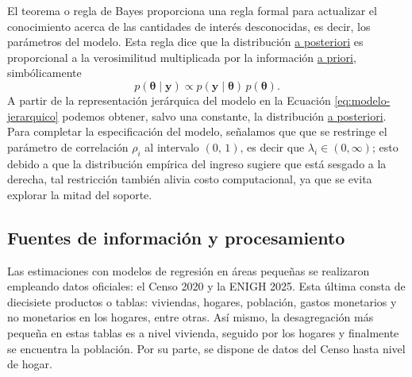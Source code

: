 \documentclass[11pt]{article}
\begin{document}
El teorema o {regla de Bayes} proporciona una regla formal para actualizar el conocimiento acerca de las cantidades de interés desconocidas, es decir, los parámetros del modelo. Esta regla dice que la distribución \underline{a posteriori} es proporcional a la verosimilitud multiplicada por la información \underline{a priori}, simbólicamente
\begin{equation}
p(\boldsymbol{\theta} \mid \boldsymbol{y}) \propto p(\boldsymbol{y}\mid \boldsymbol{\theta}) \, p(\boldsymbol{\theta}).
\end{equation}
A partir de la representación jerárquica del modelo en la Ecuación \ref{eq:modelo-jerarquico} podemos obtener, salvo una constante, la distribución \underline{a posteriori}. Para completar la especificación del modelo, señalamos que que se restringe el parámetro de correlación $\rho_{i}$ al intervalo $(0,\, 1)$, es decir que $\lambda_{i}\in(0,\infty)$; esto debido a que la distribución empírica del ingreso sugiere que está sesgado a la derecha, tal restricción también alivia costo computacional, ya que se evita explorar la mitad del soporte.


\subsection{Fuentes de información y procesamiento}
\label{subsec:datos}

Las estimaciones con modelos de regresión en áreas pequeñas se realizaron empleando datos oficiales: el Censo 2020 y la ENIGH 2025. Esta última consta de diecisiete productos o tablas: viviendas, hogares, población, gastos monetarios y no monetarios en los hogares, entre otras.
Así mismo, la desagregación más pequeña en estas tablas es a nivel vivienda, seguido por los hogares y finalmente se encuentra la población. Por su parte, se dispone de datos del Censo hasta nivel de hogar.
\end{document}
